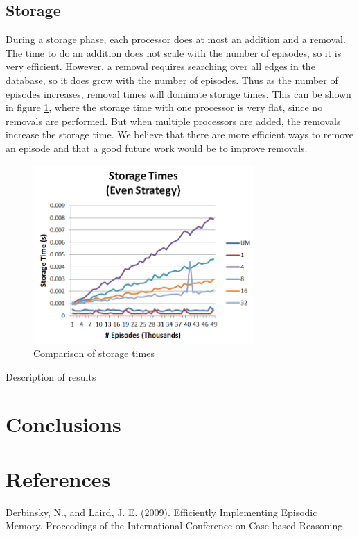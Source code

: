 \documentclass[11pt]{article} %
\begin{document}
\subsection{Storage}

During a storage phase, each processor does at most an addition and a removal. The time
to do an addition does not scale with the number of episodes, so it is very efficient. However, 
a removal requires searching over all edges in the database, so it does grow with the number of 
episodes. Thus as the number of episodes increases, removal times will dominate storage times. 
This can be shown in figure \ref{fig:storage}, where the storage time with one processor is very flat, since
no removals are performed. But when multiple processors are added, the removals increase the
storage time. We believe that there are more efficient ways to remove an episode and that a 
good future work would be to improve removals. 

\begin{figure}[h]
\caption{Comparison of storage times}\label{fig:storage}
\centering
\includegraphics[width=0.75\textwidth]{images/storage_even}
\end{figure}

Description of results


\section{Conclusions}

\section{References}

Derbinsky, N., and Laird, J. E. (2009). Efficiently Implementing Episodic
Memory. Proceedings of the International Conference on Case-based Reasoning.
\end{document}
